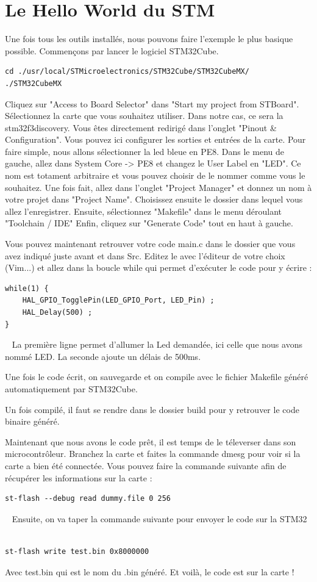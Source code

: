 \documentclass[11pt,french,a4paper]{report}
\begin{document}
\chapter{Le Hello World du STM}
Une fois tous les outils installés, nous pouvons faire l'exemple le plus basique possible. 
Commençons par lancer le logiciel STM32Cube. 
\begin{verbatim}
cd ./usr/local/STMicroelectronics/STM32Cube/STM32CubeMX/
./STM32CubeMX
\end{verbatim}
Cliquez sur "Access to Board Selector" dans "Start my project from STBoard".
Sélectionnez la carte que vous souhaitez utiliser. Dans notre cas, ce sera la stm32f3discovery.
Vous êtes directement redirigé dans l'onglet "Pinout \& Configuration". Vous pouvez ici configurer
les sorties et entrées de la carte. Pour faire simple, nous allons sélectionner la led bleue en PE8. 
Dans le menu de gauche, allez dans System Core -> PE8 et changez le User Label en "LED".
Ce nom est totament arbitraire et vous pouvez choisir de le nommer comme vous le souhaitez. 
Une fois fait, allez dans l'onglet "Project Manager" et donnez un nom à votre projet dans "Project Name".
Choisissez ensuite le dossier dans lequel vous allez l'enregistrer. 
Ensuite, sélectionnez "Makefile" dans le menu déroulant "Toolchain / IDE" 
Enfin, cliquez sur "Generate Code" tout en haut à gauche. 

Vous pouvez maintenant retrouver votre code main.c dans le dossier que vous avez indiqué juste avant et dans Src. 
Editez le avec l'éditeur de votre choix (Vim...) et allez dans la boucle while qui permet d'exécuter le code 
pour y écrire : 
\begin{verbatim}
while(1) {
    HAL_GPIO_TogglePin(LED_GPIO_Port, LED_Pin) ;
    HAL_Delay(500) ; 
}
\end{verbatim} 
La première ligne permet d'allumer la Led demandée, ici celle que nous avons nommé LED.
La seconde ajoute un délais de 500ms. 

Une fois le code écrit, on sauvegarde et on compile avec le fichier Makefile généré automatiquement 
par STM32Cube. 

Un fois compilé, il faut se rendre dans le dossier build pour y retrouver le code binaire généré.

Maintenant que nous avons le code prêt, il est temps de le téleverser dans son microcontrôleur.
Branchez la carte et faites la commande dmesg pour voir si la carte a bien été connectée. 
Vous pouvez faire la commande suivante afin de récupérer les informations sur la carte : 
\begin{verbatim}
st-flash --debug read dummy.file 0 256
\end{verbatim} 
Ensuite, on va taper la commande suivante pour envoyer le code sur la STM32 
\begin{verbatim} 
st-flash write test.bin 0x8000000
\end{verbatim}
Avec test.bin qui est le nom du .bin généré. 
Et voilà, le code est sur la carte !
\end{document}
